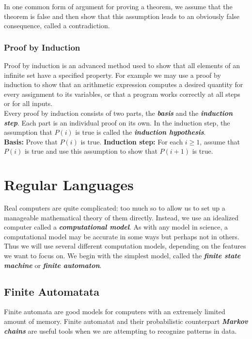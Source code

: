 \documentclass{article}
\newcommand{\bold}[1]{\textbf{#1}}
\newcommand{\define}[1]{\textbf{\textit{#1}}}
\begin{document}
In one common form of argument for proving a theorem, we assume that the theorem is false and then show that this assumption leads to an obviously false consequence, called a contradiction. 

\subsubsection{Proof by Induction}

Proof by induction is an advanced method used to show that all elements of an infinite set have a specified property. For example we may use a proof by induction to show that an arithmetic expression computes a desired quantity for every assignment to its variables, or that a program works correctly at all steps or for all inputs. \\ 

Every proof by induction consists of two parts, the \define{basis} and the \define{induction step}. Each part is an individual proof on its own. In the induction step, the assumption that $P(i)$ is true is called the \define{induction hypothesis}. \\

\bold{Basis:} Prove that $P(i)$ is true. 
\bold{Induction step:} For each $i \geq 1$, assume that $P(i)$ is true and use this assumption to show that $P(i+1)$ is true. \\ 

\section{Regular Languages}

Real computers are quite complicated: too much so to allow us to set up a manageable mathematical theory of them directly. Instead, we use an idealized computer called a \define{computational model}. As with any model in science, a computational model may be accurate in some ways but perhaps not in others. Thus we will use several different computation models, depending on the features we want to focus on. We begin with the simplest model, called the \define{finite state machine} or \define{finite automaton}. 

\subsection{Finite Automatata}

Finite automata are good models for computers with an extremely limited amount of memory. Finite automatat and their probabilistic counterpart \define{Markov chains} are useful tools when we are attempting to recognize patterns in data. \\ 
\end{document}
